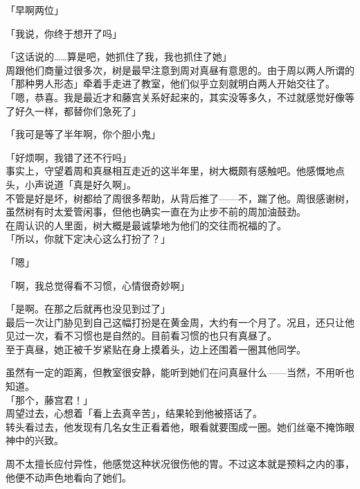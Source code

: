 「早啊两位」

「我说，你终于想开了吗」

「这话说的……算是吧，她抓住了我，我也抓住了她」\\

周跟他们商量过很多次，树是最早注意到周对真昼有意思的。由于周以两人所谓的「那种男人形态」牵着手走进了教室，他们似乎立刻就明白两人开始交往了。\\

「嗯，恭喜。我是最近才和藤宫关系好起来的，其实没等多久，不过就感觉好像等了好久一样，都替你们急死了」

「我可是等了半年啊，你个胆小鬼」

「好烦啊，我错了还不行吗」\\

事实上，守望着周和真昼相互走近的这半年里，树大概颇有感触吧。他感慨地点头，小声说道「真是好久啊」。\\

不管是好是坏，树都给了周很多帮助，从背后推了——不，踹了他。周很感谢树，虽然树有时太爱管闲事，但他也确实一直在为止步不前的周加油鼓劲。\\

在周认识的人里面，树大概是最诚挚地为他们的交往而祝福的了。\\

「所以，你就下定决心这么打扮了？」

「嗯」

「啊，我总觉得看不习惯，心情很奇妙啊」

「是啊。在那之后就再也没见到过了」\\

最后一次让门胁见到自己这幅打扮是在黄金周，大约有一个月了。况且，还只让他见过一次，看不习惯也是自然的。目前看习惯的也只有真昼了。\\

至于真昼，她正被千岁紧贴在身上摸着头，边上还围着一圈其他同学。

虽然有一定的距离，但教室很安静，能听到她们在问真昼什么——当然，不用听也知道。\\

「那个，藤宫君！」\\

周望过去，心想着「看上去真辛苦」，结果轮到他被搭话了。\\

转头看过去，他发现有几名女生正看着他，眼看就要围成一圈。她们丝毫不掩饰眼神中的兴致。

周不太擅长应付异性，他感觉这种状况很伤他的胃。不过这本就是预料之内的事，他便不动声色地看向了她们。\\

